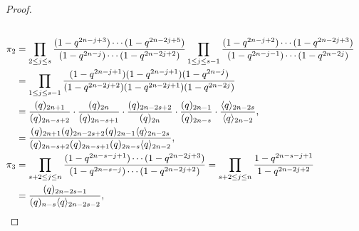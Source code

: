 \documentclass[11pt, leqno]{amsart}
\theoremstyle{plain}
\theoremstyle{definition}
\numberwithin{equation}{section}
\newcommand{\qPdf}[1]{\langle q \rangle_{#1}} %
\begin{document}
\begin{proof}
\begin{align*}
\allowdisplaybreaks  \\ \pi_2 & = \prod_{2 \leq j \leq s} \dfrac{(1-q^{2n-j+3}) \cdots (1-q^{2n-2j+5})}{(1-q^{2n-j}) \cdots (1-q^{2n-2j+2})} \prod_{1 \leq j \leq s-1} \dfrac{(1-q^{2n-j+2}) \cdots (1-q^{2n-2j+3})}{(1-q^{2n-j-1}) \cdots (1-q^{2n-2j})}
\allowdisplaybreaks  \\ & = \prod_{1 \leq j \leq s-1} \dfrac{(1-q^{2n-j+1}) (1-q^{2n-j+1}) (1-q^{2n-j})}{(1-q^{2n-2j+2}) (1-q^{2n-2j+1}) (1-q^{2n-2j})}
\allowdisplaybreaks  \\ & = \dfrac{(q)_{2n+1}}{(q)_{2n-s+2}} \cdot \dfrac{(q)_{2n}}{(q)_{2n-s+1}} \cdot \dfrac{(q)_{2n-2s+2}}{(q)_{2n}} \cdot \dfrac{(q)_{2n-1}}{(q)_{2n-s}} \cdot \dfrac{\qPdf{2n-2s}}{\qPdf{2n-2}},
\allowdisplaybreaks  \\ & = \dfrac{(q)_{2n+1} (q)_{2n-2s+2} (q)_{2n-1} \qPdf{2n-2s}}{(q)_{2n-s+2} (q)_{2n-s+1} (q)_{2n-s} \qPdf{2n-2}},
%
\allowdisplaybreaks  \\ \pi_3 & = \prod_{s+2 \leq j \leq n} \dfrac{(1-q^{2n-s-j+1}) \cdots (1-q^{2n-2j+3})}{(1-q^{2n-s-j}) \cdots (1-q^{2n-2j+2})} = \prod_{s+2 \leq j \leq n} \dfrac{1-q^{2n-s-j+1}}{1-q^{2n-2j+2}}
 \\ & = \dfrac{(q)_{2n-2s-1}}{(q)_{n-s} \qPdf{2n-2s-2}},
%

\end{align*}
\end{proof}
\end{document}
